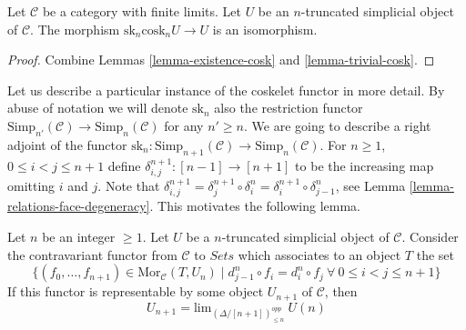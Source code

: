 \begin{lemma}
\label{lemma-recover-cosk}
Let $\mathcal{C}$ be a category with finite limits.
Let $U$ be an $n$-truncated simplicial object of $\mathcal{C}$.
The morphism $\text{sk}_n \text{cosk}_n U \to U$
is an isomorphism.
\end{lemma}

\begin{proof}
Combine Lemmas \ref{lemma-existence-cosk} and \ref{lemma-trivial-cosk}.
\end{proof}

\noindent
Let us describe a particular instance of the coskelet functor in more detail.
By abuse of notation we will denote $\text{sk}_n$
also the restriction functor
$\text{Simp}_{n'}(\mathcal{C}) \to \text{Simp}_n(\mathcal{C})$
for any $n' \geq n$. We are going to describe a right adjoint
of the functor
$\text{sk}_n : \text{Simp}_{n + 1}(\mathcal{C})
\to \text{Simp}_n(\mathcal{C})$.
For $n \geq 1$, $0 \leq i < j \leq n + 1$
define $\delta^{n + 1}_{i, j} : [n - 1] \to [n + 1]$
to be the increasing map omitting $i$ and $j$.
Note that
$\delta^{n + 1}_{i, j} =
\delta^{n + 1}_j \circ \delta^n_i =
\delta^{n + 1}_i \circ \delta^n_{j - 1}$, see
Lemma \ref{lemma-relations-face-degeneracy}. This motivates
the following lemma.

\begin{lemma}
\label{lemma-formula-limit}
Let $n$ be an integer $\geq 1$.
Let $U$ be a $n$-truncated simplicial object of $\mathcal{C}$.
Consider the contravariant functor from $\mathcal{C}$ to
$\textit{Sets}$ which associates to an object $T$ the set
$$
\{ (f_0, \ldots, f_{n + 1}) \in \text{Mor}_{\mathcal{C}}(T, U_n)
\mid
d^n_{j - 1} \circ f_i = d^n_i \circ f_j\ 
\forall\ 0\leq i < j\leq n + 1\}
$$
If this functor is representable by some object $U_{n + 1}$
of $\mathcal{C}$, then
$$
U_{n + 1} = \text{lim}_{(\Delta/[n + 1])_{\leq n}^{opp}}\ U(n)
$$
\end{lemma}

